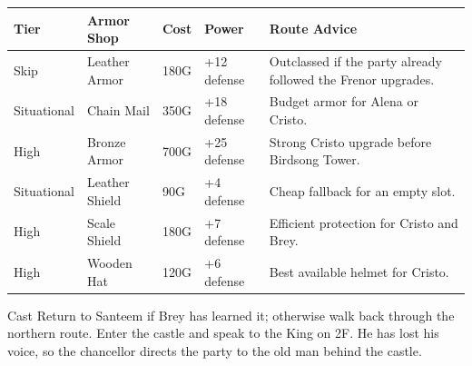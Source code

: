 \documentclass[
  american,
  10pt,
  letterpaper,
  oneside,
  open=any]{scrreprt}
\newcounter{none} %
\newenvironment{guidetable}{%
  \small\setstretch{1.0}%
  \setlength{\tabcolsep}{4pt}%
  \setlength{\LTpre}{8pt}\setlength{\LTpost}{10pt}%
  \renewcommand{\arraystretch}{1.16}%
}{ }
\begin{document}
\begin{guidetable}

{\def\LTcaptype{none} %
\begin{longtable}[]{@{}
  >{\raggedright\arraybackslash}p{}
  >{\raggedright\arraybackslash}p{}
  >{\raggedleft\arraybackslash}p{}
  >{\raggedleft\arraybackslash}p{}
  >{\raggedright\arraybackslash}p{}@{}}
\toprule\noalign{}
\begin{minipage}[b]{\linewidth}\raggedright
\color{GuideGreen}\bfseries Tier
\end{minipage} & \begin{minipage}[b]{\linewidth}\raggedright
\color{GuideGreen}\bfseries Armor Shop
\end{minipage} & \begin{minipage}[b]{\linewidth}\raggedleft
\color{GuideGreen}\bfseries Cost
\end{minipage} & \begin{minipage}[b]{\linewidth}\raggedleft
\color{GuideGreen}\bfseries Power
\end{minipage} & \begin{minipage}[b]{\linewidth}\raggedright
\color{GuideGreen}\bfseries Route Advice
\end{minipage} \\
\midrule\noalign{}
\endhead
\bottomrule\noalign{}
\endlastfoot
Skip & Leather Armor & 180G & +12 defense & Outclassed if the party
already followed the Frenor upgrades. \\
Situational & Chain Mail & 350G & +18 defense & Budget armor for Alena
or Cristo. \\
High & Bronze Armor & 700G & +25 defense & Strong Cristo upgrade before
Birdsong Tower. \\
Situational & Leather Shield & 90G & +4 defense & Cheap fallback for an
empty slot. \\
High & Scale Shield & 180G & +7 defense & Efficient protection for
Cristo and Brey. \\
High & Wooden Hat & 120G & +6 defense & Best available helmet for
Cristo. \\
\end{longtable}
}

\end{guidetable}

Cast Return to Santeem if Brey has learned it; otherwise walk back
through the northern route. Enter the castle and speak to the King on
2F. He has lost his voice, so the chancellor directs the party to the
old man behind the castle.
\end{document}
